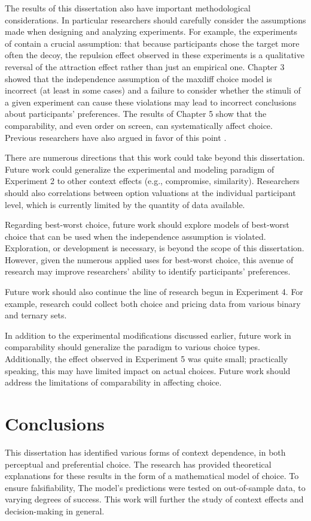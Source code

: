 The results of this dissertation also have important methodological considerations. In particular researchers should carefully consider the assumptions made when designing and analyzing experiments. For example, the experiments of \textcite{spektorWhenGoodLooks2018b} contain a crucial assumption: that because participants chose the target more often the decoy, the repulsion effect observed in these experiments is a qualitative reversal of the attraction effect rather than just an empirical one. Chapter 3 showed that the independence assumption of the maxdiff choice model is incorrect (at least in some cases) and a failure to consider whether the stimuli of a given experiment can cause these violations may lead to incorrect conclusions about participants' preferences. The results of Chapter 5 show that the comparability, and even order on screen, can systematically affect choice. Previous researchers have also argued in favor of this point \parencite{trueblood2022attentional,hasan2025registered,evansImpactPresentationOrder2021}. 

There are numerous directions that this work could take beyond this dissertation. Future work could generalize the experimental and modeling paradigm of Experiment 2 to other context effects (e.g., compromise, similarity). Researchers should also correlations between option valuations at the individual participant level, which is currently limited by the quantity of data available. 

Regarding best-worst choice, future work should explore models of best-worst choice that can be used when the independence assumption is violated. Exploration, or development is necessary, is beyond the scope of this dissertation. However, given the numerous applied uses for best-worst choice, this avenue of research may improve researchers' ability to identify participants' preferences. 

Future work should also continue the line of research begun in Experiment 4. For example, research could collect both choice and pricing data from various binary and ternary sets. 

In addition to the experimental modifications discussed earlier, future work in comparability should generalize the paradigm to various choice types. Additionally, the effect observed in Experiment 5 was quite small; practically speaking, this may have limited impact on actual choices. Future work should address the limitations of comparability in affecting choice.

\section{Conclusions}
This dissertation has identified various forms of context dependence, in both perceptual and preferential choice. The research has provided theoretical explanations for these results in the form of a mathematical model of choice. To ensure falsifiability, The model's predictions were tested on out-of-sample data, to varying degrees of success. This work will further the study of context effects and decision-making in general. 
